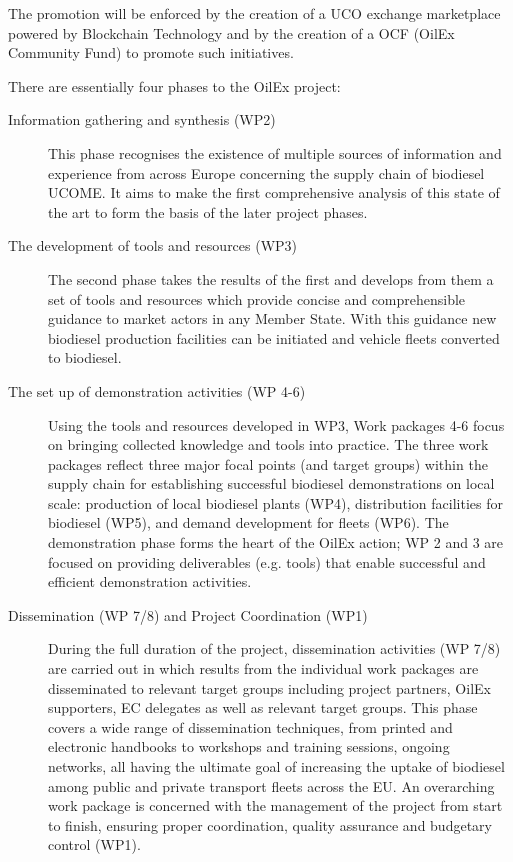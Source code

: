 \documentclass[11pt,fleqn]{book} %
\begin{document}
The promotion will be enforced by the creation of a UCO exchange marketplace powered by Blockchain Technology and by the creation of a OCF (OilEx Community Fund) to promote such initiatives.

There are essentially four phases to the OilEx project:
\begin{description}
	\item[Information gathering and synthesis (WP2)] This phase recognises the existence of multiple sources of information and experience from
    across Europe concerning the supply chain of biodiesel UCOME. It aims to make the first
    comprehensive analysis of this state of the art to form the basis of the later project phases.    
	\item[The development of tools and resources (WP3)] The second phase takes the results of the first and develops from them a set of tools and
    resources which provide concise and comprehensible guidance to market actors in any
    Member State. With this guidance new biodiesel production facilities can be initiated and
    vehicle fleets converted to biodiesel.    
    \item[The set up of demonstration activities (WP 4-6)] Using the tools and resources developed in WP3, Work packages 4-6 focus on bringing
    collected knowledge and tools into practice. The three work packages reflect three major
    focal points (and target groups) within the supply chain for establishing successful biodiesel
    demonstrations on local scale: production of local biodiesel plants (WP4), distribution
    facilities for biodiesel (WP5), and demand development for fleets (WP6). The demonstration
    phase forms the heart of the OilEx action; WP 2 and 3 are focused on providing
    deliverables (e.g. tools) that enable successful and efficient demonstration activities.    
    \item[Dissemination (WP 7/8) and Project Coordination (WP1)] During the full duration of the project, dissemination activities (WP 7/8) are carried out in
    which results from the individual work packages are disseminated to relevant target groups
    including project partners, OilEx supporters, EC delegates as well as relevant target
    groups. This phase covers a wide range of dissemination techniques, from printed and
    electronic handbooks to workshops and training sessions, ongoing networks, all having the
    ultimate goal of increasing the uptake of biodiesel among public and private transport fleets
    across the EU. An overarching work package is concerned with the management of the
    project from start to finish, ensuring proper coordination, quality assurance and budgetary
    control (WP1).
\end{description}
\end{document}
